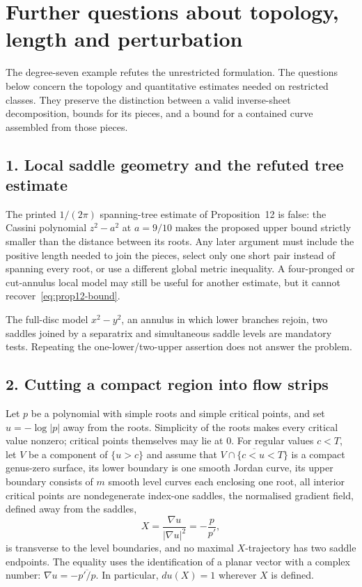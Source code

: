 \section{Further questions about topology, length and perturbation}\label{sec:open}

The degree-seven example refutes the unrestricted formulation. The
questions below concern the topology and quantitative estimates needed
on restricted classes. They preserve the distinction between a valid
inverse-sheet decomposition, bounds for its pieces, and a bound for a
contained curve assembled from those pieces.

\subsection*{1. Local saddle geometry and the refuted tree estimate}

\begin{problem}\label{prob:saddle1041}
The printed $1/(2\pi)$ spanning-tree estimate of Proposition~12 is false: the
Cassini polynomial $z^2-a^2$ at $a=9/10$ makes the proposed upper bound
strictly smaller than the distance between its roots. Any later argument must
include the positive length needed to join the pieces, select only one short
pair instead of spanning every root, or use a different global metric inequality.  A four-pronged or
cut-annulus local model may still be useful for another estimate, but it cannot
recover~\eqref{eq:prop12-bound}.
\end{problem}

The full-disc model $x^2-y^2$, an annulus in which lower branches rejoin, two
saddles joined by a separatrix and simultaneous saddle levels are mandatory
tests.  Repeating the one-lower/two-upper assertion does not answer the
problem.

\subsection*{2. Cutting a compact region into flow strips}

Let $p$ be a polynomial with simple roots and simple critical points, and
set $u=-\log|p|$ away from the roots. Simplicity of the roots makes every
critical value nonzero; critical points themselves may lie at $0$.
For regular values $c<T$, let $V$ be a component of $\{u>c\}$ and assume that
$\overline{V\cap\{c<u<T\}}$ is a compact genus-zero surface, its lower
boundary is one smooth Jordan curve, its upper boundary consists of $m$ smooth
level curves each enclosing one root, all interior critical points are nondegenerate index-one saddles,
the normalised gradient field, defined away from the saddles,
\[
 X=\frac{\nabla u}{|\nabla u|^2}=-\frac{p}{p'},
\]
is transverse to the level boundaries, and no maximal $X$-trajectory has two
saddle endpoints. The equality uses the identification of a planar vector
with a complex number: $\nabla u=-\overline{p'/p}$. In particular,
$du(X)=1$ wherever $X$ is defined.

